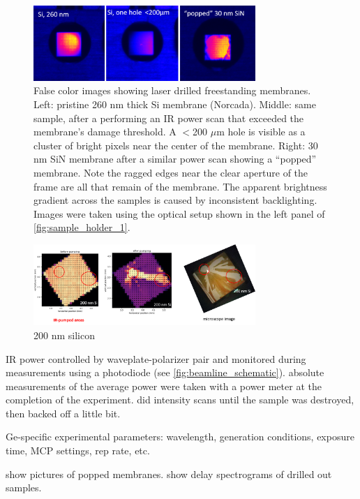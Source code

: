 \begin{figure}
	\centering
	\includegraphics[width=0.75\textwidth]{figures/chap3/sample_damage.png}
	\caption{False color images showing laser drilled freestanding membranes. Left: pristine 260 nm thick Si membrane (Norcada). Middle: same sample, after a performing an IR power scan that exceeded the membrane's damage threshold. A $<$200 $\mu$m hole is visible as a cluster of bright pixels near the center of the membrane. Right: 30 nm SiN membrane after a similar power scan showing a ``popped'' membrane. Note the ragged edges near the clear aperture of the frame are all that remain of the membrane. The apparent brightness gradient across the samples is caused by inconsistent backlighting. Images were taken using the optical setup shown in the left panel of \cref{fig:sample_holder_1}.}
	\label{fig:sample_damage}
\end{figure}

\begin{figure}
	\centering
	\includegraphics[width=0.75\textwidth]{figures/chap3/Si_damage.png}
	\caption{200 nm silicon}
	\label{fig:Si_damage}
\end{figure}

IR power controlled by waveplate-polarizer pair and monitored during measurements using a photodiode (see \cref{fig:beamline_schematic}). absolute measurements of the average power were taken with a power meter at the completion of the experiment. did intensity scans until the sample was destroyed, then backed off a little bit.


Ge-specific experimental parameters: wavelength, generation conditions, exposure time, MCP settings, rep rate, etc.

show pictures of popped membranes. show delay spectrograms of drilled out samples.

